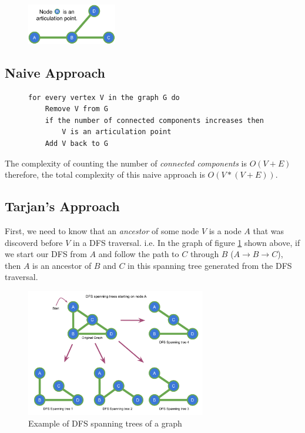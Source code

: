 \documentclass[twoside]{book}
\begin{document}
\begin{figure}[H]
  \centering
  \includegraphics[width=0.35\textwidth]{"Images/Graph Theory/Articulation Points And Bridges/g1.pdf"}
  \caption{}
  \label{fig:apb_g1}
\end{figure}

\subsection*{Naive Approach}

\begin{figure}[thp]
  \centering
  \begin{minipage}[c]{0.9\textwidth}
    \begin{verbatim}
for every vertex V in the graph G do
    Remove V from G
    if the number of connected components increases then
        V is an articulation point
    Add V back to G
      \end{verbatim}
  \end{minipage}
\end{figure}

The complexity of counting the number of \textit{connected components} is $O(V + E)$ therefore,
the total complexity of this naive approach is $O(V * (V + E))$.

\subsection*{Tarjan's Approach}

First, we need to know that an \textit{ancestor} of some node $V$ is a node $A$ that was discoverd
before $V$ in a DFS traversal. i.e. In the graph of figure \ref{fig:apb_g1} shown above, if we start
our DFS from $A$ and follow the path to $C$ through $B$ ($A \rightarrow B \rightarrow C$), then $A$
is an ancestor of $B$ and $C$ in this spanning tree generated from the DFS traversal.\\

\begin{figure}[H]
  \centering
  \includegraphics[width=0.7\textwidth]{"Images/Graph Theory/Articulation Points And Bridges/g2.pdf"}
  \caption{Example of DFS spanning trees of a graph}
  \label{fig:apb_g2}
\end{figure}
\end{document}
